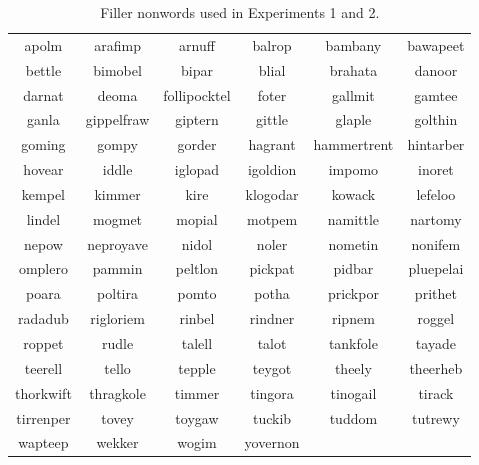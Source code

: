 \begin{table}[ht]
\caption{Filler nonwords used in Experiments 1 and 2.}
\label{tbl:fillernonwords}
\centering
\begin{tabular}{cccccc}
\toprule
apolm     & arafimp    & arnuff       & balrop   & bambany     & bawapeet  \\
bettle    & bimobel    & bipar        & blial    & brahata     & danoor    \\
darnat    & deoma      & follipocktel & foter    & gallmit     & gamtee    \\
ganla     & gippelfraw & giptern      & gittle   & glaple      & golthin   \\
goming    & gompy      & gorder       & hagrant  & hammertrent & hintarber \\
hovear    & iddle      & iglopad      & igoldion & impomo      & inoret    \\
kempel    & kimmer     & kire         & klogodar & kowack      & lefeloo   \\
lindel    & mogmet     & mopial       & motpem   & namittle    & nartomy   \\
nepow     & neproyave  & nidol        & noler    & nometin     & nonifem   \\
omplero   & pammin     & peltlon      & pickpat  & pidbar      & pluepelai \\
poara     & poltira    & pomto        & potha    & prickpor    & prithet   \\
radadub   & rigloriem  & rinbel       & rindner  & ripnem      & roggel    \\
roppet    & rudle      & talell       & talot    & tankfole    & tayade    \\
teerell   & tello      & tepple       & teygot   & theely      & theerheb  \\
thorkwift & thragkole  & timmer       & tingora  & tinogail    & tirack    \\
tirrenper & tovey      & toygaw       & tuckib   & tuddom      & tutrewy   \\
wapteep   & wekker     & wogim        & yovernon &             &          \\
\bottomrule
\end{tabular}
\end{table}

